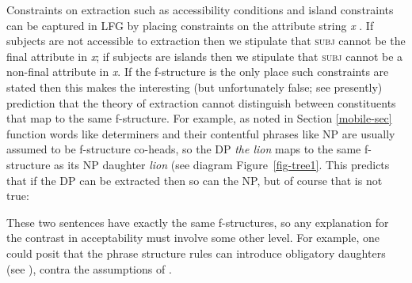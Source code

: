 Constraints on extraction such as accessibility conditions and island constraints  can be captured in LFG by placing constraints on the attribute string \textit{x} \citep{dalrymple;ea19}.  If subjects are not accessible to extraction then we stipulate that \textsc{subj} cannot be the final attribute in \textit{x}; if subjects are islands then we stipulate that \textsc{subj} cannot be a non-final attribute in \textit{x}.  If the f-structure is the only place such constraints are stated then 
this makes the interesting (but unfortunately false; see presently) prediction that the theory of extraction cannot distinguish between constituents that map to the same f-structure.  For example, as noted in Section \ref{mobile-sec} function words like determiners and their contentful phrases like NP are usually assumed to be f-structure co-heads, so the DP \textit{the lion} maps to the same f-structure as its NP daughter \textit{lion} (see diagram Figure~\ref{fig-tree1}.  This predicts that if the DP can be extracted then so can the NP, but of course that is not true:

\begin{exe} 
\ex	\label{nope}
\begin{xlist}
\end{xlist}
\end{exe}
These two sentences have exactly the same f-structures, so any explanation for the contrast in acceptability must involve some other level.  For example, one could posit that the phrase structure rules can introduce obligatory daughters (see \cite[239]{snijders15}), contra the assumptions of \citet{BATW2015a}.  


%


